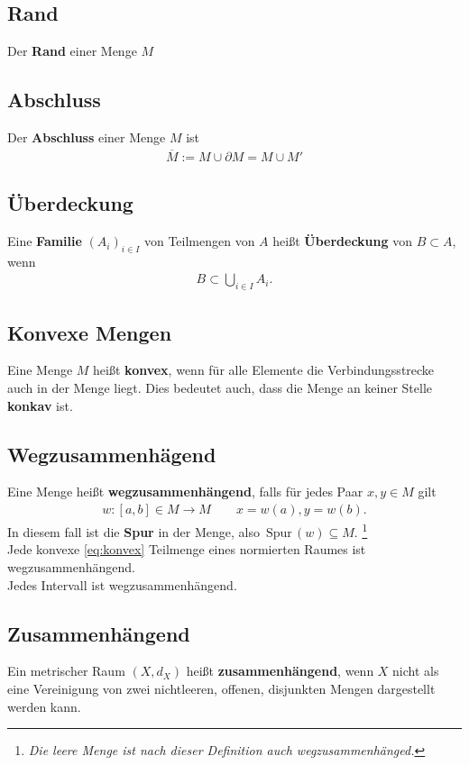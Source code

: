 \documentclass[a4paper,12pt]{article}
\numberwithin{equation}{section}
\begin{document}
\subsection{Rand}
Der \textbf{Rand} einer Menge $M$ 

\subsection{Abschluss}
Der \textbf{Abschluss} einer Menge $M$ ist
\begin{align} 
        \overline{M}:=M\cup \partial M=M\cup M'
\end{align} 

\subsection{Überdeckung}
Eine \textbf{Familie} $\left(A_i\right)_{i \in I}$ von Teilmengen von $A$ heißt \textbf{Überdeckung} von $B\subset A$, wenn
\begin{align} 
        B\subset \bigcup _{i \in I}A_i\label{eq:überdeckung}
.\end{align} 

\subsection{Konvexe Mengen}
Eine Menge $M$ heißt \textbf{konvex}, wenn für alle Elemente die Verbindungsstrecke auch in der Menge liegt. Dies bedeutet auch, dass die Menge an keiner Stelle \textbf{konkav} ist.$\label{eq:konvex}$ 

\subsection{Wegzusammenhägend}
Eine Menge heißt \textbf{wegzusammenhängend}, falls für jedes Paar $x,y \in M$ gilt
\begin{align} 
        w:\left[a,b\right] \in M\rightarrow M\qquad x=w\left(a\right),y=w\left(b\right)\label{eq:wegzusammenhängend}
.\end{align} 
In diesem fall ist die \textbf{Spur} in der Menge, also $\,\text{Spur}\,\left(w\right)\subseteq M$.
\footnote{\textit{Die leere Menge ist nach dieser Definition auch wegzusammenhänged.}}\\
Jede konvexe \eqref{eq:konvex} Teilmenge eines normierten Raumes ist wegzusammenhängend.\\
Jedes Intervall ist wegzusammenhängend.

\subsection{Zusammenhängend}
Ein metrischer Raum $\left(X,d_X\right)$ heißt \textbf{zusammenhängend}, wenn $X$ nicht als eine Vereinigung von zwei nichtleeren, offenen, disjunkten Mengen dargestellt werden kann.
\end{document}
